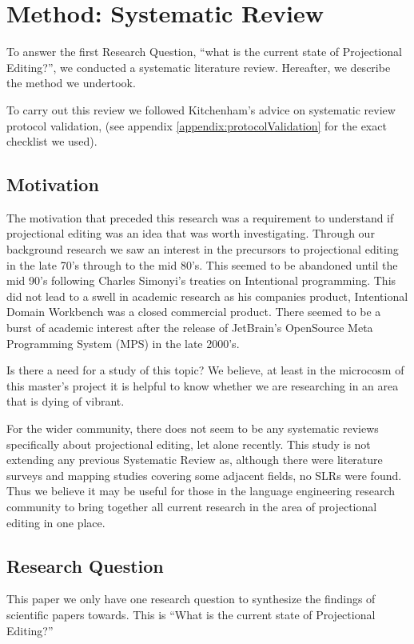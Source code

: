 \section{Method: Systematic Review}\label{section:Method_systematic_review}

To answer the first Research Question, ``what is the current state of Projectional Editing?'', we conducted a systematic literature review.
Hereafter, we describe the method we undertook.

To carry out this review we followed Kitchenham's\cite{Kitchenham_2015} advice on systematic review protocol validation, (see appendix \ref{appendix:protocolValidation} for the exact checklist we used).

\subsection{Motivation}
The motivation that preceded this research was a requirement to understand if projectional editing was an idea that was worth investigating.
Through our background research we saw an interest in the precursors to projectional editing in the late 70's through to the mid 80's.
This seemed to be abandoned until the mid 90's following Charles Simonyi's treaties on Intentional programming.
This did not lead to a swell in academic research as his companies product, Intentional Domain Workbench was a closed commercial product.
There seemed to be a burst of academic interest after the release of JetBrain's OpenSource Meta Programming System (MPS) in the late 2000's.

Is there a need for a study of this topic? 
We believe, at least in the microcosm of this master's project it is helpful to know whether we are researching in an area that is dying of vibrant.

For the wider community, there does not seem to be any systematic reviews specifically about projectional editing, let alone recently.
This study is not extending any previous Systematic Review as, although there were literature surveys and mapping studies covering some adjacent fields, no SLRs were found.
Thus we believe it may be useful for those in the language engineering research community to bring together all current research in the area of projectional editing in one place.

\subsection{Research Question}
This paper we only have one research question to synthesize the findings of scientific papers towards.
This is ``What is the current state of Projectional Editing?''

